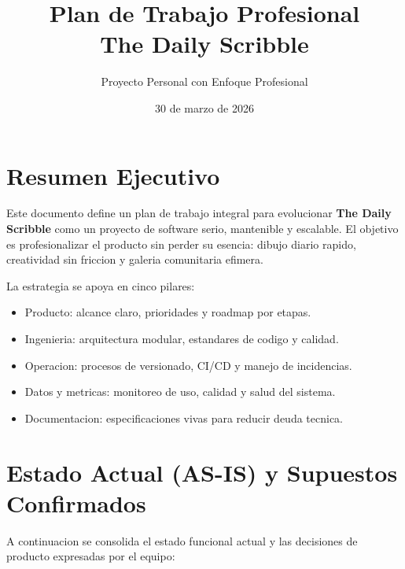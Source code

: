\documentclass[12pt,a4paper]{article}
\title{Plan de Trabajo Profesional\\\large The Daily Scribble}
\author{Proyecto Personal con Enfoque Profesional}
\date{30 de marzo de 2026}
\begin{document}
\maketitle
\tableofcontents
\newpage

\section{Resumen Ejecutivo}
Este documento define un plan de trabajo integral para evolucionar \textbf{The Daily Scribble} como un proyecto de software serio, mantenible y escalable. El objetivo es profesionalizar el producto sin perder su esencia: dibujo diario rapido, creatividad sin friccion y galeria comunitaria efimera.

La estrategia se apoya en cinco pilares:
\begin{itemize}
  \item Producto: alcance claro, prioridades y roadmap por etapas.
  \item Ingenieria: arquitectura modular, estandares de codigo y calidad.
  \item Operacion: procesos de versionado, CI/CD y manejo de incidencias.
  \item Datos y metricas: monitoreo de uso, calidad y salud del sistema.
  \item Documentacion: especificaciones vivas para reducir deuda tecnica.
\end{itemize}

\section{Estado Actual (AS-IS) y Supuestos Confirmados}
A continuacion se consolida el estado funcional actual y las decisiones de producto expresadas por el equipo:
\end{document}

